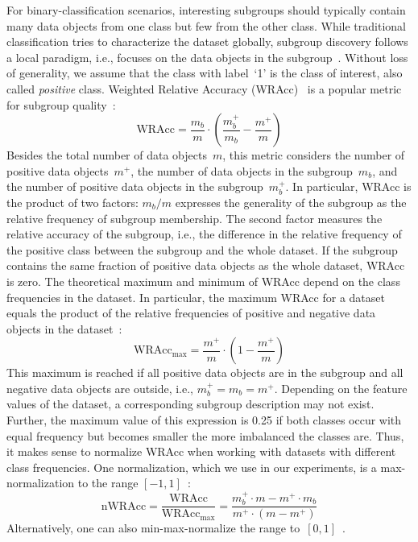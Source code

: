 \documentclass{article}
\theoremstyle{definition}
\begin{document}
For binary-classification scenarios, interesting subgroups should typically contain many data objects from one class but few from the other class.
While traditional classification tries to characterize the dataset globally, subgroup discovery follows a local paradigm, i.e., focuses on the data objects in the subgroup~\cite{meeng2021real}.
Without loss of generality, we assume that the class with label~`1' is the class of interest, also called \emph{positive} class.
Weighted Relative Accuracy (WRAcc)~\cite{lavravc1999rule} is a popular metric for subgroup quality~\cite{meeng2021real}:
%
\begin{equation}
	\text{WRAcc} = \frac{m_b}{m} \cdot \left( \frac{m_b^+}{m_b} - \frac{m^+}{m} \right)
	\label{eq:csd:wracc}
\end{equation}
%
Besides the total number of data objects~$m$, this metric considers the number of positive data objects~$m^+$, the number of data objects in the subgroup~$m_b$, and the number of positive data objects in the subgroup~$m_b^+$.
In particular, WRAcc is the product of two factors:
$m_b / m$ expresses the generality of the subgroup as the relative frequency of subgroup membership.
The second factor measures the relative accuracy of the subgroup, i.e., the difference in the relative frequency of the positive class between the subgroup and the whole dataset.
If the subgroup contains the same fraction of positive data objects as the whole dataset, WRAcc is zero.
The theoretical maximum and minimum of WRAcc depend on the class frequencies in the dataset.
In particular, the maximum WRAcc for a dataset equals the product of the relative frequencies of positive and negative data objects in the dataset~\cite{mathonat2021anytime}:
%
\begin{equation}
	\text{WRAcc}_{\text{max}} = \frac{m^+}{m} \cdot \left( 1 - \frac{m^+}{m} \right)
	\label{eq:csd:wracc-max}
\end{equation}
%
This maximum is reached if all positive data objects are in the subgroup and all negative data objects are outside, i.e., $m_b^+ = m_b = m^+$.
Depending on the feature values of the dataset, a corresponding subgroup description may not exist.
Further, the maximum value of this expression is 0.25 if both classes occur with equal frequency but becomes smaller the more imbalanced the classes are.
Thus, it makes sense to normalize WRAcc when working with datasets with different class frequencies.
One normalization, which we use in our experiments, is a max-normalization to the range $[-1, 1]$~\cite{mathonat2021anytime}:
%
\begin{equation}
	\text{nWRAcc} = \frac{\text{WRAcc}}{\text{WRAcc}_{\text{max}}} = \frac{m_b^+ \cdot m - m^+ \cdot m_b}{m^+ \cdot (m - m^+)}
	\label{eq:csd:wracc-normalized}
\end{equation}
%
Alternatively, one can also min-max-normalize the range to~$[0, 1]$~\cite{carmona2018unifying, ventura2018subgroup}.
\end{document}
